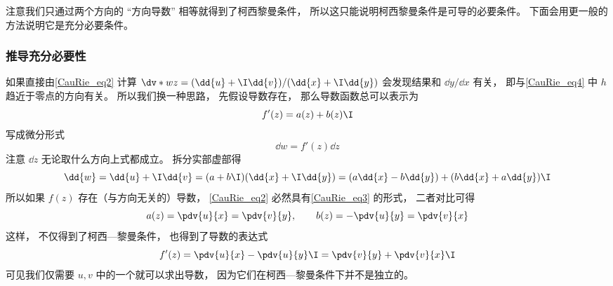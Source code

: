 注意我们只通过两个方向的 “方向导数” 相等就得到了柯西黎曼条件， 所以这只能说明柯西黎曼条件是可导的必要条件。 下面会用更一般的方法说明它是充分必要条件。

\subsubsection{推导充分必要性}
如果直接由\autoref{CauRie_eq2} 计算 $\dv*{w}{z} = (\dd{u} + \I \dd{v})/(\dd{x} + \I \dd{y})$ 会发现结果和 $\dd{y}/\dd{x}$ 有关， 即与\autoref{CauRie_eq4} 中 $h$ 趋近于零点的方向有关。 所以我们换一种思路， 先假设导数存在， 那么导数函数总可以表示为
\begin{equation}
f'(z) = a(z) + b(z)\I
\end{equation}
写成微分形式
\begin{equation}
\dd{w} = f'(z)\dd{z}
\end{equation}
注意 $\dd z$ 无论取什么方向上式都成立。 拆分实部虚部得
\begin{equation}\label{CauRie_eq3}
\dd{w} = \dd{u} + \I \dd{v} = (a + b\I)(\dd{x} + \I\dd{y}) = (a \dd{x} - b\dd{y}) + (b \dd{x} + a\dd{y})\I
\end{equation}
所以如果 $f(z)$ 存在（与方向无关的）导数， \autoref{CauRie_eq2} 必然具有\autoref{CauRie_eq3} 的形式， 二者对比可得
\begin{equation}
a(z) = \pdv{u}{x} = \pdv{v}{y}, \qquad
b(z) = -\pdv{u}{y} = \pdv{v}{x}
\end{equation}
这样， 不仅得到了柯西—黎曼条件， 也得到了导数的表达式
\begin{equation}
f'(z) = \pdv{u}{x} -\pdv{u}{y} \I = \pdv{v}{y} + \pdv{v}{x}\I
\end{equation}
可见我们仅需要 $u, v$ 中的一个就可以求出导数， 因为它们在柯西—黎曼条件下并不是独立的。

